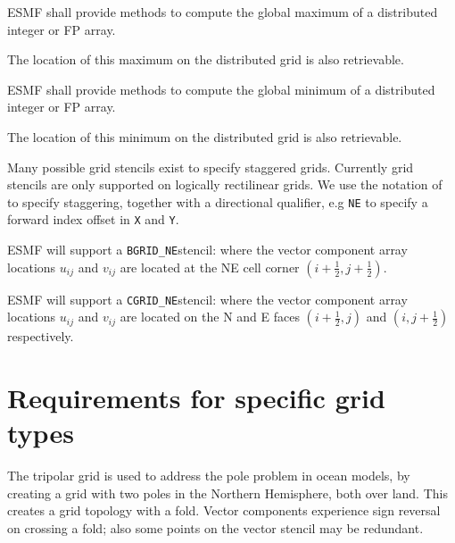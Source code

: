 
ESMF shall provide methods to compute the global maximum of a
distributed integer or FP array.


The location of this maximum on the distributed grid is also
retrievable.


ESMF shall provide methods to compute the global minimum of a
distributed integer or FP array.


The location of this minimum on the distributed grid is also
retrievable.


Many possible grid stencils exist to specify staggered grids.
Currently grid stencils are only supported on logically rectilinear
grids. We use the notation of \cite{ref:a1966} to specify staggering,
together with a directional qualifier, e.g \texttt{NE} to specify a
forward index offset in \texttt{X} and \texttt{Y}.

\newcommand{\bgridne}{\texttt{BGRID\_NE}{}}
\newcommand{\cgridne}{\texttt{CGRID\_NE}{}}
\sreq{\bgridne}

ESMF will support a \bgridne stencil: where the vector
component array locations $u_{ij}$ and $v_{ij}$ are located at the NE
cell corner $(i+\frac12,j+\frac12)$.

\sreq{\cgridne}

ESMF will support a \cgridne stencil: where the vector
component array locations $u_{ij}$ and $v_{ij}$ are located on the N
and E faces $(i+\frac12,j)$ and $(i,j+\frac12)$ respectively.

\part{Requirements for specific grid types} \label{DG:gridtypes}



The tripolar grid \cite{ref:m1996} is used to address the pole problem
in ocean models, by creating a grid with two poles in the Northern
Hemisphere, both over land. This creates a grid topology with a
fold. Vector components experience sign reversal on crossing a fold;
also some points on the vector stencil may be redundant.

